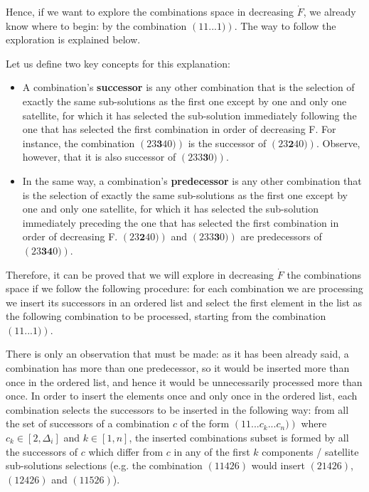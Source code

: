 Hence, if we want to explore the combinations space in decreasing $\dot{F}$, we already know where to begin: by the combination $\left(1 1 ... 1)\right)$. The way to follow the exploration is explained below.

Let us define two key concepts for this explanation:
\begin{itemize}
\item A combination's \textbf{successor} is any other combination that is the selection of exactly the same sub-solutions as the first one except by one and only one satellite, for which it has selected the sub-solution immediately following the one that has selected the first combination in order of decreasing F. For instance, the combination $\left(2 3 \mathbf{3} 4 0)\right)$ is the successor of $\left(2 3 \mathbf{2} 4 0)\right)$. Observe, however, that it is also successor of $\left(2 3 3 \mathbf{3} 0)\right)$.
\item In the same way, a combination's \textbf{predecessor} is any other combination that is the selection of exactly the same sub-solutions as the first one except by one and only one satellite, for which it has selected the sub-solution immediately preceding the one that has selected the first combination in order of decreasing F. $\left(2 3 \mathbf{2} 4 0)\right)$ and $\left(2 3 3 \mathbf{3} 0)\right)$ are predecessors of $\left(2 3 \mathbf{3 4} 0)\right)$.
\end{itemize}

Therefore, it can be proved that we will explore in decreasing $\dot{F}$ the combinations space if we follow the following procedure: for each combination we are processing we insert its successors in an ordered list and select the first element in the list as the following combination to be processed, starting from the combination $\left(1 1 ... 1)\right)$.

There is only an observation that must be made: as it has been already said, a combination has more than one predecessor, so it would be inserted more than once in the ordered list, and hence it would be unnecessarily processed more than once. In order to insert the elements once and only once in the ordered list, each combination selects the successors to be inserted in the following way: from all the set of successors of a combination $c$ of the form $\left(1 1 ... c_k ... c_n)\right)$ where $c_k \in [2, \Delta_i]$ and $k \in [1,n]$, the inserted combinations subset is formed by all the successors of $c$ which differ from $c$ in any of the first $k$ components / satellite sub-solutions selections (e.g. the combination $(1 1 4 2 6)$ would insert $(2 1 4 2 6)$, $(1 2 4 2 6)$ and $(1 1 5 2 6)$).

